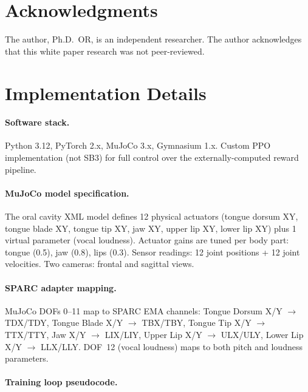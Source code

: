 \documentclass[11pt, a4paper]{article}
\begin{document}
\section*{Acknowledgments}

The author, Ph.D.\ OR, is an independent researcher. The author acknowledges that this white paper research was not peer-reviewed.




\appendix

\section{Implementation Details}
\label{app:implementation}

\paragraph{Software stack.}
Python 3.12, PyTorch 2.x, MuJoCo 3.x, Gymnasium 1.x. Custom PPO implementation (not SB3) for full control over the externally-computed reward pipeline.

\paragraph{MuJoCo model specification.}
The oral cavity XML model defines 12 physical actuators (tongue dorsum XY, tongue blade XY, tongue tip XY, jaw XY, upper lip XY, lower lip XY) plus 1 virtual parameter (vocal loudness). Actuator gains are tuned per body part: tongue (0.5), jaw (0.8), lips (0.3). Sensor readings: 12 joint positions + 12 joint velocities. Two cameras: frontal and sagittal views.

\paragraph{SPARC adapter mapping.}
MuJoCo DOFs 0--11 map to SPARC EMA channels: Tongue Dorsum X/Y $\to$ TDX/TDY, Tongue Blade X/Y $\to$ TBX/TBY, Tongue Tip X/Y $\to$ TTX/TTY, Jaw X/Y $\to$ LIX/LIY, Upper Lip X/Y $\to$ ULX/ULY, Lower Lip X/Y $\to$ LLX/LLY. DOF~12 (vocal loudness) maps to both pitch and loudness parameters.

\paragraph{Training loop pseudocode.}
\end{document}
